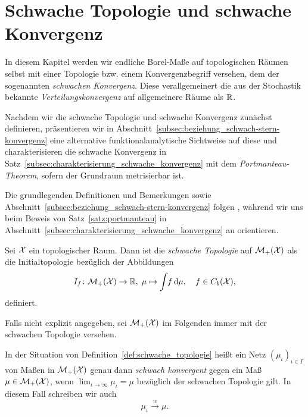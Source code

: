 \documentclass[../thesis/thesis.tex]{subfiles}
\begin{document}
	
	\chapter{Schwache Topologie und schwache Konvergenz}
	\label{chap:schwache_topologie}
	
	In diesem Kapitel werden wir endliche Borel-Maße auf topologischen Räumen selbst
	mit einer Topologie bzw. einem Konvergenzbegriff versehen, dem der sogenannten \emph{schwachen Konvergenz}. Diese
	verallgemeinert die aus der Stochastik bekannte \emph{Verteilungskonvergenz} auf allgemeinere Räume als $\mathbb{R}$. 
	
	Nachdem wir die schwache Topologie und schwache Konvergenz zunächst definieren, präsentieren wir in Abschnitt~\ref{subsec:beziehung_schwach-stern-konvergenz}
	eine alternative funktionalanalytische Sichtweise auf diese und charakterisieren die schwache Konvergenz in Satz~\ref{subsec:charakterisierung_schwache_konvergenz} mit dem \emph{Portmanteau-Theorem},
	sofern der Grundraum metrisierbar ist.
	
	Die grundlegenden Definitionen und Bemerkungen sowie Abschnitt~\ref{subsec:beziehung_schwach-stern-konvergenz} folgen 
	\cite[Section 1-3]{Varadarajan.1958}, während wir uns beim Beweis von Satz~\ref{satz:portmanteau} in Abschnitt~\ref{subsec:charakterisierung_schwache_konvergenz}
	an \cite[Theorem 4.14.4]{Simon.2015} orientieren.
	
	\begin{Definition}
		\label{def:schwache_topologie}
		Sei $\mathcal{X}$ ein topologischer Raum. Dann ist die \emph{schwache Topologie} auf $\mathcal{M}_{+}(\mathcal{X})$ als die 
		Initialtopologie bezüglich der Abbildungen
		\[ I_f \colon \mathcal{M}_{+}(\mathcal{X}) \to \mathbb{R}, \; \mu \mapsto \int_{} \, f \, \mathrm{d}\mu , \quad f \in C_b(\mathcal{X}) \text{,} \]
		definiert.
	\end{Definition}

	Falls nicht explizit angegeben, sei $\mathcal{M}_{+}(\mathcal{X})$ im Folgenden immer mit der schwachen Topologie versehen.

	\begin{Definition}
		In der Situation von Definition~\ref{def:schwache_topologie} heißt ein Netz $(\mu_\iota)_{\iota \in I}$ von Maßen in $\mathcal{M}_{+}(\mathcal{X})$ genau dann 
		\emph{schwach konvergent} gegen ein Maß $\mu \in \mathcal{M}_{+}(\mathcal{X})$, wenn $\lim_{\iota \to \infty} \mu_\iota = \mu$ bezüglich der schwachen Topologie gilt.
		In diesem Fall schreiben wir auch
		\[ \mu_\iota \xrightarrow{w} \mu \text{.} \]
	\end{Definition}
\end{document}
